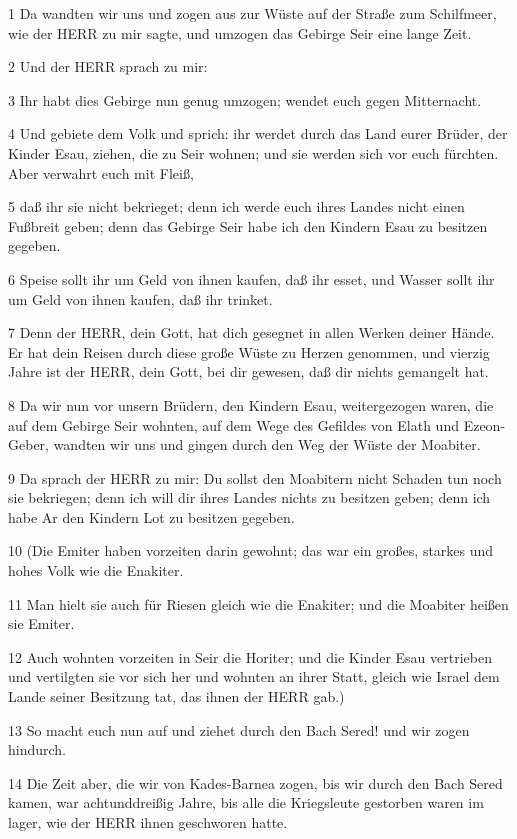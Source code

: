 \par 1 Da wandten wir uns und zogen aus zur Wüste auf der Straße zum Schilfmeer, wie der HERR zu mir sagte, und umzogen das Gebirge Seir eine lange Zeit.
\par 2 Und der HERR sprach zu mir:
\par 3 Ihr habt dies Gebirge nun genug umzogen; wendet euch gegen Mitternacht.
\par 4 Und gebiete dem Volk und sprich: ihr werdet durch das Land eurer Brüder, der Kinder Esau, ziehen, die zu Seir wohnen; und sie werden sich vor euch fürchten. Aber verwahrt euch mit Fleiß,
\par 5 daß ihr sie nicht bekrieget; denn ich werde euch ihres Landes nicht einen Fußbreit geben; denn das Gebirge Seir habe ich den Kindern Esau zu besitzen gegeben.
\par 6 Speise sollt ihr um Geld von ihnen kaufen, daß ihr esset, und Wasser sollt ihr um Geld von ihnen kaufen, daß ihr trinket.
\par 7 Denn der HERR, dein Gott, hat dich gesegnet in allen Werken deiner Hände. Er hat dein Reisen durch diese große Wüste zu Herzen genommen, und vierzig Jahre ist der HERR, dein Gott, bei dir gewesen, daß dir nichts gemangelt hat.
\par 8 Da wir nun vor unsern Brüdern, den Kindern Esau, weitergezogen waren, die auf dem Gebirge Seir wohnten, auf dem Wege des Gefildes von Elath und Ezeon-Geber, wandten wir uns und gingen durch den Weg der Wüste der Moabiter.
\par 9 Da sprach der HERR zu mir: Du sollst den Moabitern nicht Schaden tun noch sie bekriegen; denn ich will dir ihres Landes nichts zu besitzen geben; denn ich habe Ar den Kindern Lot zu besitzen gegeben.
\par 10 (Die Emiter haben vorzeiten darin gewohnt; das war ein großes, starkes und hohes Volk wie die Enakiter.
\par 11 Man hielt sie auch für Riesen gleich wie die Enakiter; und die Moabiter heißen sie Emiter.
\par 12 Auch wohnten vorzeiten in Seir die Horiter; und die Kinder Esau vertrieben und vertilgten sie vor sich her und wohnten an ihrer Statt, gleich wie Israel dem Lande seiner Besitzung tat, das ihnen der HERR gab.)
\par 13 So macht euch nun auf und ziehet durch den Bach Sered! und wir zogen hindurch.
\par 14 Die Zeit aber, die wir von Kades-Barnea zogen, bis wir durch den Bach Sered kamen, war achtunddreißig Jahre, bis alle die Kriegsleute gestorben waren im lager, wie der HERR ihnen geschworen hatte.
